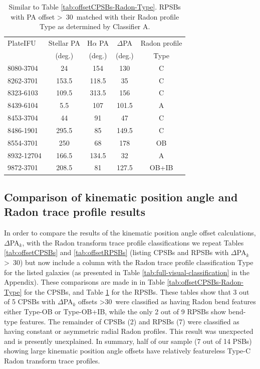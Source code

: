 \begin{table}
\centering
\caption[RPSBs with $\Delta$PA$_{k}$ offset \textgreater 30\textdegree\ matched with their Radon profile Type as determined by Classifier A]{Similar to Table \ref{tab:offsetCPSBs-Radon-Type}. RPSBs with PA offset \textgreater\ 30\textdegree\  matched with their Radon profile Type as determined by Classifier A.}
\label{tab:offsetRPSBs-Radon-Type}
\begin{tabular}{lcccc}
\hline
PlateIFU   & Stellar PA & H$\alpha$ PA & $\Delta$PA & Radon profile \\
  & (deg.) & (deg.) & (deg.) & Type\\
\hline
8080-3704 & 24 & 154 & 130 & C \\
8262-3701 & 153.5 & 118.5 & 35 & C \\
8323-6103 & 109.5 & 313.5 & 156 & C \\
8439-6104 & 5.5 & 107 & 101.5 & A \\
8453-3704 & 44 & 91 & 47 & C \\
8486-1901 & 295.5 & 85 & 149.5 & C \\
8554-3701 & 250 & 68 & 178 & OB \\
8932-12704 & 166.5 & 134.5 & 32 & A \\
9872-3701 & 208.5 & 81 & 127.5 & OB+IB \\
\hline
\end{tabular}
\end{table}

\subsection[Comparison of kinematic position angle and Radon trace profile results]{Comparison of kinematic position angle and Radon trace profile results}
\label{sec:comparison-of-results}
In order to compare the results of the kinematic position angle offset calculations, $\Delta$PA$_{k}$, with the Radon transform trace profile classifications we repeat Tables \ref{tab:offsetCPSBs} and \ref{tab:offsetRPSBs} (listing CPSBs and RPSBs with $\Delta$PA$_{k}$ \textgreater\ 30\textdegree) but now include a column with the Radon trace profile classification Type for the listed galaxies (as presented in  Table \ref{tab:full-visual-classification} in the Appendix). These comparisons are made in in Table \ref{tab:offsetCPSBs-Radon-Type} for the CPSBs, and Table  \ref{tab:offsetRPSBs-Radon-Type} for the RPSBs. 
These tables show that 3 out of 5 CPSBs with $\Delta$PA$_{k}$ offsets \textgreater 30\textdegree\ were classified as having Radon bend features either Type-OB or Type-OB+IB, while the only 2 out of 9 RPSBs show bend-type features. The remainder of CPSBs (2) and RPSBs (7) were classified as having constant or asymmetric radial Radon profiles. This result was unexpected and is presently unexplained. In summary, half of our sample (7 out of 14 PSBs) showing large kinematic position angle offsets have relatively featureless Type-C Radon transform trace profiles.

